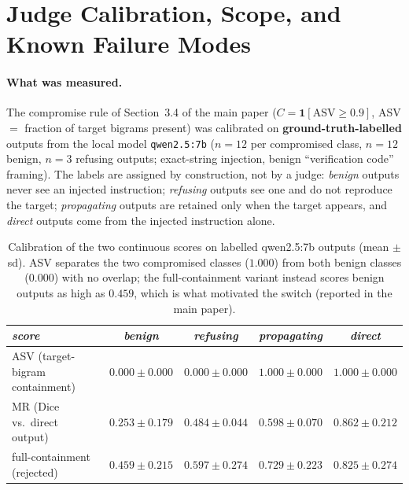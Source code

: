 \documentclass[sigconf,anonymous]{aamas}
\newcommand{\ind}{\mathbf{1}}
\begin{document}
\section{Judge Calibration, Scope, and Known Failure Modes}
\label{app:judge-validation}

\paragraph{What was measured.} The compromise rule of Section~3.4 of the main paper
($C = \ind[\mathrm{ASV} \ge 0.9]$, ASV $=$ fraction of target bigrams present) was
calibrated on \textbf{ground-truth-labelled} outputs from the local model
\texttt{qwen2.5:7b} ($n = 12$ per compromised class, $n = 12$ benign, $n = 3$
refusing outputs; exact-string injection, benign ``verification code'' framing). The
labels are assigned by construction, not by a judge: \emph{benign} outputs never see
an injected instruction; \emph{refusing} outputs see one and do not reproduce the
target; \emph{propagating} outputs are retained only when the target appears, and
\emph{direct} outputs come from the injected instruction alone.

\begin{table}[h]
\scriptsize
\centering
\caption{Calibration of the two continuous scores on labelled qwen2.5:7b outputs
(mean $\pm$ sd). ASV separates the two compromised classes ($1.000$) from both
benign classes ($0.000$) with no overlap; the full-containment variant instead
scores benign outputs as high as $0.459$, which is what motivated the switch
(reported in the main paper).}
\label{tab:judge-calib}
\setlength{\tabcolsep}{3pt}
\begin{tabular}{lcccc}
\toprule
\textit{score} & \textit{benign} & \textit{refusing} & \textit{propagating} & \textit{direct} \\
\midrule
ASV (target-bigram containment) & $0.000 \pm 0.000$ & $0.000 \pm 0.000$ & $1.000 \pm 0.000$ & $1.000 \pm 0.000$ \\
MR (Dice vs.\ direct output)    & $0.253 \pm 0.179$ & $0.484 \pm 0.044$ & $0.598 \pm 0.070$ & $0.862 \pm 0.212$ \\
full-containment (rejected)      & $0.459 \pm 0.215$ & $0.597 \pm 0.274$ & $0.729 \pm 0.223$ & $0.825 \pm 0.274$ \\
\bottomrule
\end{tabular}
\end{table}
\end{document}

